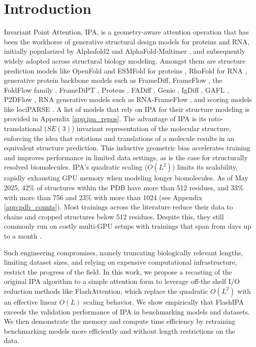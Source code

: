 \documentclass{article}
\begin{document}
\section{Introduction}
Invariant Point Attention, IPA, is a geometry-aware attention operation that has been the workhorse of generative structural design models for proteins and RNA, initially popularized by Alphafold2 \cite{jumper2021highly} and AlphaFold-Multimer \cite{evans2021protein}, and subsequently widely adopted across structural biology modeling. Amongst them are structure prediction models like OpenFold and ESMFold for proteins  \cite{ahdritz2024openfold, lin2022language}, RhoFold for RNA \cite{shen2024accurate}, generative protein backbone models such as FrameDiff\cite{yim2023}, FrameFlow \cite{yim2024, yim2023flow}, the FoldFlow family \cite{huguet2024sequence, bose2024se3}, FrameDiPT \cite{Zhang2023.11.21.568057}, Proteus \cite{wang2024proteus}, FADiff \cite{liu2024floating}, Genie \cite{lin2023generating}, IgDiff \cite{cutting2024novo}, GAFL \cite{wagnerseute2024gafl}, P2DFlow \cite{jin2025p2dflow}, RNA generative models such as RNA-FrameFlow \cite{anand2024rnaframeflow}, and scoring models like lociPARSE \cite{tarafder2024lociparse}. A list of models that rely on IPA for their structure modeling is provided in Appendix \ref{app:ipa_repos}.
The advantage of IPA is its roto-translational ($SE(3)$) invariant representation of the molecular structure, enforcing the idea that rotations and translations of a molecule results in an equivalent structure prediction. This inductive geometric bias accelerates training and improves performance in limited data settings, as is the case for structurally resolved biomolecules.
IPA's quadratic scaling ($O(L^2)$) limits its scalability, rapidly exhausting GPU memory when modeling longer biomolecules. As of May 2025, 42\% of structures within the PDB have more than 512 residues, and 33\% with more than 756 and 23\% with more than 1024 (see Appendix \ref{app:pdb_counts}). Most trainings across the literature reduce their data to chains and cropped structures below 512 residues. Despite this, they still commonly run on costly multi-GPU setups with trainings that span from days up to a month \cite{shen2024accurate,yim2023}. 

Such engineering compromises, namely truncating biologically relevant lengths, limiting dataset sizes, and relying on expensive computational infrastructure, restrict the progress of the field. 
In this work, we propose a recasting of the original IPA algorithm to a simple attention form to leverage off-the shelf I/O reduction methods like FlashAttention, which replace the quadratic $O(L^2)$ with an effective linear $O(L)$ scaling behavior. We show empirically that FlashIPA exceeds the validation performance of IPA in benchmarking models and datasets. We then demonstrate the memory and compute time efficiency by retraining benchmarking models more efficiently and without length restrictions on the data. 
\end{document}
